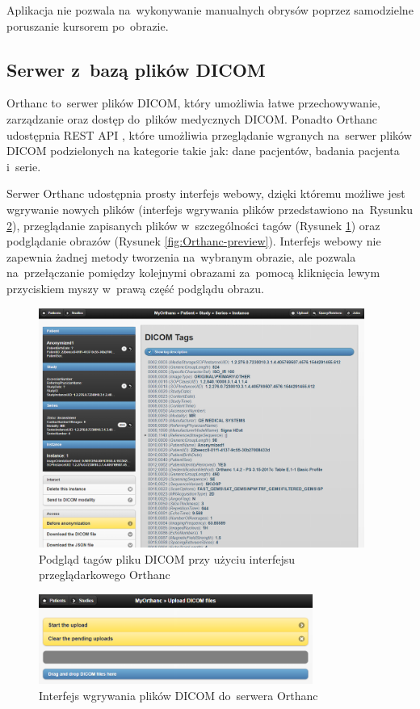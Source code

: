 \documentclass[a4paper,11pt,twoside,openright]{report}
\theoremstyle{definition}
\begin{document}
Aplikacja nie pozwala na~wykonywanie manualnych obrysów poprzez samodzielne
poruszanie kursorem po~obrazie.

\subsection {Serwer z~bazą plików DICOM}

Orthanc \cite{Orthanc} to~serwer plików DICOM, który umożliwia łatwe przechowywanie,
zarządzanie oraz dostęp do~plików medycznych DICOM. Ponadto Orthanc udostępnia
REST API \cite{Orthanc API}, które umożliwia przeglądanie wgranych na~serwer plików DICOM podzielonych
na kategorie takie jak: dane pacjentów, badania pacjenta i~serie.

Serwer Orthanc udostępnia prosty interfejs webowy, dzięki któremu możliwe jest
wgrywanie nowych plików (interfejs wgrywania plików przedstawiono na~Rysunku
\ref{fig:Orthanc-upload}), przeglądanie zapisanych plików w~szczególności
tagów (Rysunek \ref{fig:Orthanc-tags}) oraz podglądanie obrazów (Rysunek \ref{fig:Orthanc-preview}).
Interfejs webowy nie zapewnia żadnej metody tworzenia na~wybranym obrazie, ale
pozwala na~przełączanie pomiędzy kolejnymi obrazami za~pomocą kliknięcia lewym
przyciskiem myszy w~prawą część podglądu obrazu.

\begin{figure}[tb!]
	\center
	\includegraphics[width=0.95\textwidth]{Orthanc-tags}
	\caption{Podgląd tagów pliku DICOM przy użyciu interfejsu przeglądarkowego Orthanc}
    	\label{fig:Orthanc-tags}
\end{figure}

\begin{figure}[tb!]
	\center
	\includegraphics[width=0.8\textwidth]{Orthanc-upload}
	\caption{Interfejs wgrywania plików DICOM do~serwera Orthanc \cite{Orthanc}}
    	\label{fig:Orthanc-upload}
\end{figure}
\end{document}
